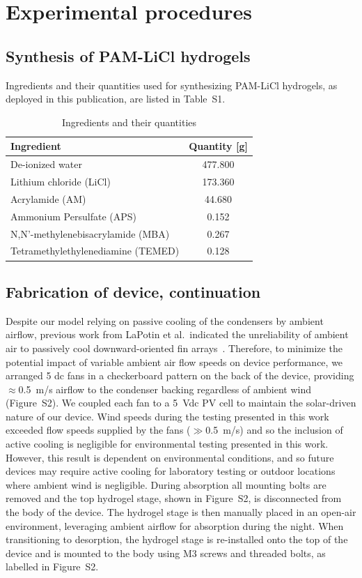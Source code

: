 \documentclass[11pt]{article}
\begin{document}
\section{Experimental procedures}

\subsection{Synthesis of PAM-LiCl hydrogels}

Ingredients and their quantities used for synthesizing PAM-LiCl hydrogels, as deployed in this publication, are listed in Table~S1.

\begin{table}[h]
\centering
\caption{Ingredients and their quantities}
\label{tab:S1}
\begin{tabular}{lc}
\toprule
Ingredient & Quantity [g] \\
\midrule
De-ionized water & 477.800 \\
Lithium chloride (LiCl) & 173.360 \\
Acrylamide (AM) & 44.680 \\
Ammonium Persulfate (APS) & 0.152 \\
N,N'-methylenebisacrylamide (MBA) & 0.267 \\
Tetramethylethylenediamine (TEMED) & 0.128 \\
\bottomrule
\end{tabular}
\end{table}

\subsection{Fabrication of device, continuation}

Despite our model relying on passive cooling of the condensers by ambient airflow, previous work from LaPotin et al.\ indicated the unreliability of ambient air to passively cool downward-oriented fin arrays~\cite{slapotin2021}. Therefore, to minimize the potential impact of variable ambient air flow speeds on device performance, we arranged 5 dc fans in a checkerboard pattern on the back of the device, providing $\approx$0.5~m/s airflow to the condenser backing regardless of ambient wind (Figure~S2). We coupled each fan to a 5~Vdc PV cell to maintain the solar-driven nature of our device. Wind speeds during the testing presented in this work exceeded flow speeds supplied by the fans ($\gg$0.5~m/s) and so the inclusion of active cooling is negligible for environmental testing presented in this work. However, this result is dependent on environmental conditions, and so future devices may require active cooling for laboratory testing or outdoor locations where ambient wind is negligible. During absorption all mounting bolts are removed and the top hydrogel stage, shown in Figure~S2, is disconnected from the body of the device. The hydrogel stage is then manually placed in an open-air environment, leveraging ambient airflow for absorption during the night. When transitioning to desorption, the hydrogel stage is re-installed onto the top of the device and is mounted to the body using M3 screws and threaded bolts, as labelled in Figure~S2.
\end{document}
